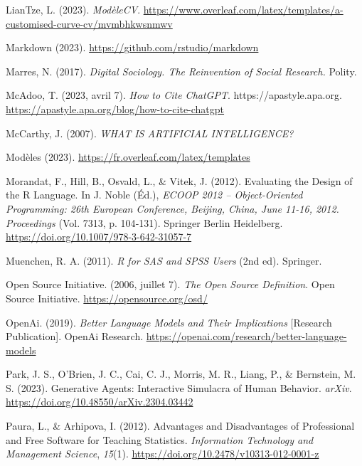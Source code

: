 \documentclass[
  letterpaper,
  DIV=11,
  numbers=noendperiod]{scrreprt}
\newlength{\cslhangindent}
\newenvironment{CSLReferences}[2] %
 {\begin{list}{}{%
  \setlength{\itemindent}{0pt}
  \setlength{\leftmargin}{0pt}
  \setlength{\parsep}{0pt}
  \ifodd #1
   \setlength{\leftmargin}{\cslhangindent}
   \setlength{\itemindent}{-1\cslhangindent}
  \fi
  \setlength{\itemsep}{#2\baselineskip}}}
 {\end{list}}
\begin{document}
\begin{CSLReferences}{1}{0}
LianTze, L. (2023). \emph{{ModèleCV}}.
\url{https://www.overleaf.com/latex/templates/a-customised-curve-cv/mvmbhkwsnmwv}

Markdown (2023). \url{https://github.com/rstudio/markdown}

Marres, N. (2017). \emph{Digital {Sociology}. {The Reinvention} of
{Social Research}.} Polity.

McAdoo, T. (2023, avril 7). \emph{How to Cite {ChatGPT}}.
https://apastyle.apa.org.
\url{https://apastyle.apa.org/blog/how-to-cite-chatgpt}

McCarthy, J. (2007). \emph{{WHAT IS ARTIFICIAL INTELLIGENCE}?}

Modèles (2023). \url{https://fr.overleaf.com/latex/templates}

Morandat, F., Hill, B., Osvald, L., \& Vitek, J. (2012). Evaluating the
{Design} of the {R Language}. In J. Noble (Éd.), \emph{{ECOOP} 2012 --
{Object-Oriented Programming}: 26th {European Conference}, {Beijing},
{China}, {June} 11-16, 2012. {Proceedings}} (Vol. 7313, p. 104‑131).
Springer Berlin Heidelberg.
\url{https://doi.org/10.1007/978-3-642-31057-7}

Muenchen, R. A. (2011). \emph{R for {SAS} and {SPSS} Users} (2nd ed).
Springer.

Open Source Initiative. (2006, juillet 7). \emph{The {Open Source
Definition}}. Open Source Initiative. \url{https://opensource.org/osd/}

OpenAi. (2019). \emph{Better Language Models and Their Implications}
{[}Research Publication{]}. OpenAi Research.
\url{https://openai.com/research/better-language-models}

Park, J. S., O'Brien, J. C., Cai, C. J., Morris, M. R., Liang, P., \&
Bernstein, M. S. (2023). Generative {Agents}: {Interactive Simulacra} of
{Human Behavior}. \emph{arXiv}.
\url{https://doi.org/10.48550/arXiv.2304.03442}

Paura, L., \& Arhipova, I. (2012). Advantages and {Disadvantages} of
{Professional} and {Free Software} for {Teaching Statistics}.
\emph{Information Technology and Management Science}, \emph{15}(1).
\url{https://doi.org/10.2478/v10313-012-0001-z}


\end{CSLReferences}
\end{document}
